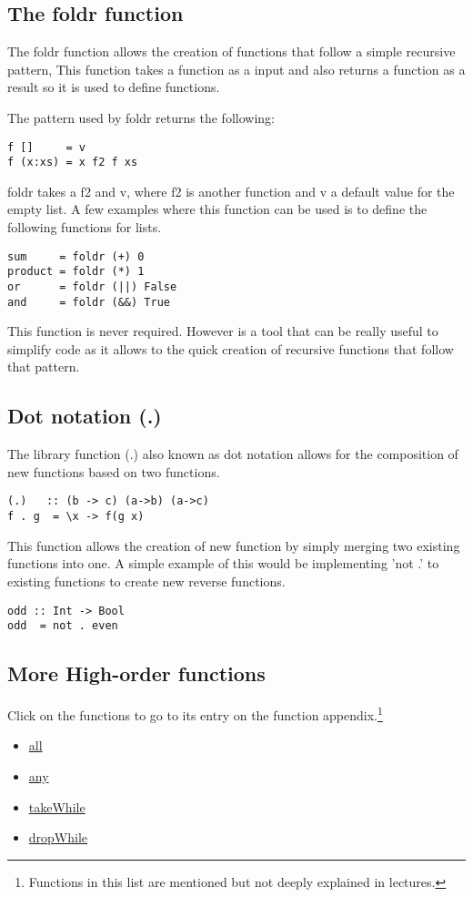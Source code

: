 \documentclass[12pt, oneside]{article}
\begin{document}
\subsection{The foldr function}
The foldr function allows the creation of functions that follow a simple recursive pattern, This function takes a function as a input and also returns a function as a result so it is used to define functions.

The pattern used by foldr returns the following:
\begin{lstlisting}
f []     = v
f (x:xs) = x f2 f xs
\end{lstlisting}
foldr takes a f2 and v, where f2 is another function and v a default value for the empty list. A few examples where this function can be used is to define the following functions for lists.
\begin{lstlisting}
sum     = foldr (+) 0
product = foldr (*) 1
or      = foldr (||) False
and     = foldr (&&) True
\end{lstlisting}
This function is never required. However is a tool that can be really useful to simplify code as it allows to the quick creation of recursive functions that follow that pattern.
\subsection{Dot notation (.)}
The library function (.) also known as dot notation allows for the composition of new functions based on two functions.
\begin{lstlisting}
(.)   :: (b -> c) (a->b) (a->c)
f . g  = \x -> f(g x)
\end{lstlisting}
This function allows the creation of new function by simply merging two existing functions into one. A simple example of this would be implementing 'not .' to existing functions to create new reverse functions.
\begin{lstlisting}
odd :: Int -> Bool
odd  = not . even
\end{lstlisting}
\subsection{More High-order functions}
Click on the functions to go to its entry on the function appendix.\footnote{Functions in this list are mentioned but not deeply explained in lectures.}
\begin{itemize}
\item{\hyperref[all]{all}}
\item{\hyperref[any]{any}}
\item{\hyperref[takeWhile]{takeWhile}}
\item{\hyperref[dropWhile]{dropWhile}}
\end{itemize}
\end{document}
